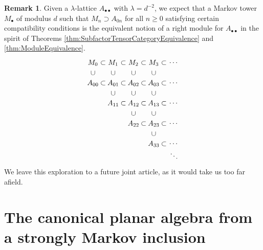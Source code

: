 \documentclass[11pt]{article}
\theoremstyle{plain}
\theoremstyle{definition}
\newtheorem{rem}[thm]{Remark}
\begin{document}
\begin{rem}
\label{rem:LambdaLatticeModule}
Given a $\lambda$-lattice $A_{\bullet\bullet}$ with $\lambda = d^{-2}$, we expect that a Markov tower $M_\bullet$ of modulus $d$ such that $M_n \supset A_{0n}$ for all $n\geq 0$ satisfying certain compatibility conditions is the equivalent notion of a right module for $A_{\bullet\bullet}$ in the spirit of Theorems \ref{thm:SubfactorTensorCategoryEquivalence} and \ref{thm:ModuleEquivalence}.
$$
\begin{tikzpicture}
 \node at (0,1) {$M_{0}$};
 \node at (.5,1) {$\subset$};
 \node at (1,1) {$M_{1}$};
 \node at (1.5,1) {$\subset$};
 \node at (2,1) {$M_{2}$};
 \node at (2.5,1) {$\subset$};
 \node at (3,1) {$M_{3}$};
 \node at (3.5,1) {$\subset$};
 \node at (4,1) {$\cdots$};
%
 \node at (0,.5) {$\cup$};
 \node at (1,.5) {$\cup$};
 \node at (2,.5) {$\cup$};
 \node at (3,.5) {$\cup$};
%
 \node at (0,0) {$A_{00}$};
 \node at (.5,0) {$\subset$};
 \node at (1,0) {$A_{01}$};
 \node at (1.5,0) {$\subset$};
 \node at (2,0) {$A_{02}$};
 \node at (2.5,0) {$\subset$};
 \node at (3,0) {$A_{03}$};
 \node at (3.5,0) {$\subset$};
 \node at (4,0) {$\cdots$};
%
 \node at (1,-.5) {$\cup$};
 \node at (2,-.5) {$\cup$};
 \node at (3,-.5) {$\cup$};
%
 \node at (1,-1) {$A_{11}$};
 \node at (1.5,-1) {$\subset$};
 \node at (2,-1) {$A_{12}$};
 \node at (2.5,-1) {$\subset$};
 \node at (3,-1) {$A_{13}$};
 \node at (3.5,-1) {$\subset$};
 \node at (4,-1) {$\cdots$};
%
 \node at (2,-1.5) {$\cup$};
 \node at (3,-1.5) {$\cup$};
%
 \node at (2,-2) {$A_{22}$};
 \node at (2.5,-2) {$\subset$};
 \node at (3,-2) {$A_{23}$};
 \node at (3.5,-2) {$\subset$};
 \node at (4,-2) {$\cdots$};
%
 \node at (3,-2.5) {$\cup$};
%
 \node at (3,-3) {$A_{33}$};
 \node at (3.5,-3) {$\subset$};
 \node at (4,-3) {$\cdots$};
%
 \node at (4,-3.5) {$\ddots$};
\end{tikzpicture}
$$
We leave this exploration to a future joint article, as it would take us too far afield.
\end{rem}







\section{The canonical planar algebra from a strongly Markov inclusion} 
\end{document}
